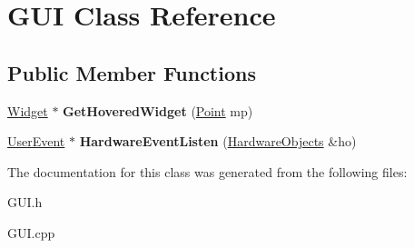 \hypertarget{classGUI}{}\section{G\+UI Class Reference}
\label{classGUI}
\subsection*{Public Member Functions}
\begin{DoxyCompactItemize}
\item 
\mbox{\label{classGUI_adc6526d47aa2a5715cdea987e6117ef2}} 
\hyperlink{classWidget}{Widget} $\ast$ {\bfseries Get\+Hovered\+Widget} (\hyperlink{structPoint}{Point} mp)
\item 
\mbox{\label{classGUI_ab16d05214befe2474a0b1366a94b068b}} 
\hyperlink{classUserEvent}{User\+Event} $\ast$ {\bfseries Hardware\+Event\+Listen} (\hyperlink{classHardwareObjects}{Hardware\+Objects} \&ho)
\end{DoxyCompactItemize}


The documentation for this class was generated from the following files\+:\begin{DoxyCompactItemize}
\item 
G\+U\+I.\+h\item 
G\+U\+I.\+cpp\end{DoxyCompactItemize}
